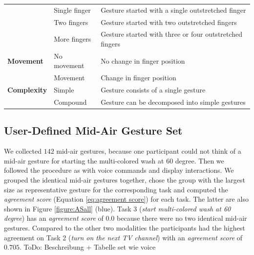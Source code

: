 \documentclass[sigchi]{acmart}
\begin{document}
\begin{table}[t]
\begin{center}
\begin{footnotesize}
\begin{tabular}{p{} p{} p{}}
										& Single finger		& Gesture started with a single outstretched finger \\
										& Two fingers		& Gesture started with two outstretched fingers \\
										& More fingers		& Gesture started with three or four outstretched fingers \\ \midrule
					\textbf{Movement}	& No movement		& No change in finger position \\
										& Movement			& Change in finger position \\ \midrule
					\textbf{Complexity}	& Simple			& Gesture consists of a single gesture \\
										& Compound			& Gesture can be decomposed into simple gestures \\ \bottomrule
				\end{tabular}
			\end{footnotesize}
		\end{center}
	\end{table}
	\subsection{User-Defined Mid-Air Gesture Set}
	We collected $142$ mid-air gestures, because one participant could not think of a mid-air gesture for starting the  multi-colored wash at $60$ degree. Then we followed the procedure as with voice commands and display interactions. We grouped the identical mid-air gestures together, chose the group with the largest size as representative gesture for the corresponding task and computed the \textit{agreement score} (Equation \ref{eq:agreement score}) for each task. The latter are also shown in Figure \ref{figure:ASall} (blue). Task 3 (\textit{start multi-colored wash at 60 degree}) has an \textit{agreement score} of $0.0$ because there were no two identical mid-air gestures. Compared to the other two modalities the participants had the highest agreement on Task 2 (\textit{turn on the next TV channel}) with an \textit{agreement score} of $0.705$.
	ToDo: Beschreibung + Tabelle set wie voice
	
\end{document}

